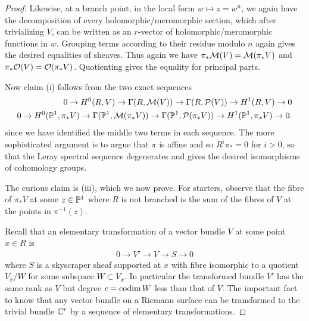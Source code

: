 \documentclass[12pt]{article}
\begin{document}
\begin{proof}
    Likewise, at a branch point, in the local form $w \mapsto z = w^n$, we again have the decomposition of every holomorphic/meromorphic section, which after trivializing $V$, can be written as an $r$-vector of holomorphic/meromorphic functions in $w$. Grouping terms according to their residue modulo $n$ again gives the desired equalities of sheaves. Thus again we have $\pi_* \cM(V) = \cM(\pi_*V)$ and $\pi_* \cO(V) = \cO(\pi_*V)$. Quotienting gives the equality for principal parts.

    Now claim (i) follows from the two exact sequences
    \begin{align*}
        0 \to H^0(R,V)
        \to \Gamma(R,\cM(V))
        \to \Gamma(R,\cP(V))
        \to H^1(R,V) \to 0 \\
        0 \to H^0(\P^1,\pi_*V)
        \to \Gamma(\P^1,\cM(\pi_*V))
        \to \Gamma(\P^1,\cP(\pi_*V))
        \to H^1(\P^1,\pi_*V) \to 0.
    \end{align*}
    since we have identified the middle two terms in each sequence. The more sophisticated argument is to argue that $\pi$ is affine and so $R^i\pi_* = 0$ for $i>0$, so that the Leray spectral sequence degenerates and gives the desired isomorphisms of cohomology groups.


    The curious claim is (iii), which we now prove. For starters, observe that the fibre of $\pi_*V$ at some $z\in\P^1$ where $R$ is not branched
    is the sum of the fibres of $V$ at the points in $\pi^{-1}(z)$.

    Recall that an elementary transformation of a vector bundle $V$ at some point $x\in R$ is \begin{align*}
        0 \to V' \to V \to S \to 0
    \end{align*} where $S$ is a skyscraper sheaf supported at $x$ with fibre isomorphic to a quotient $V_x/W$ for some subspace $W\subset V_x$. In particular the transformed bundle $V'$ has the same rank as $V$ but degree $c = \codim W$ less than that of $V$. The important fact to know that any vector bundle on a Riemann surface can be transformed to the trivial bundle $\C^r$ by a sequence of elementary transformations.


\end{proof}
\end{document}
